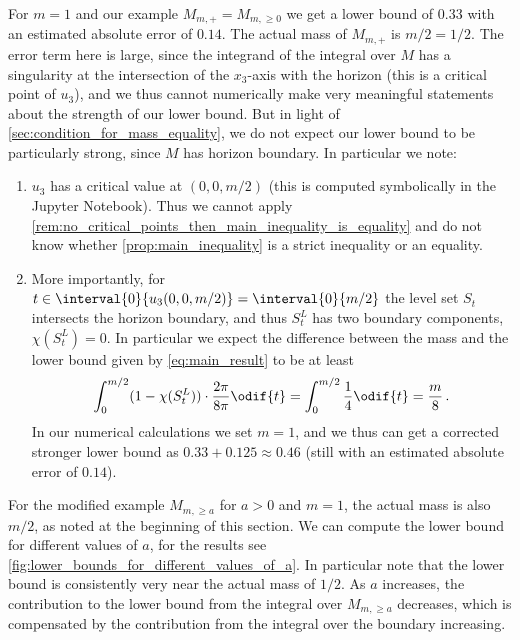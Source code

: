 \documentclass[titlepage,numbers=noenddot,oneside,%
cleardoublepage=empty,paper=a4,fontsize=11pt,%
english,%
]{scrartcl}
\newcommand*{\mathfullstop}{\,.}
\begin{document}
For \( m=1 \) and our example \( M_{m,+}=M_{m,\geq 0} \) we get a lower bound of \( 0.33 \) with an estimated absolute error of \( 0.14 \). The actual mass of \( M_{m,+} \) is \( m/2=1/2 \). The error term here is large, since the integrand of the integral over \( M \) has a singularity at the intersection of the \( x_3 \)-axis with the horizon (this is a critical point of \( u_3 \)), and we thus cannot numerically make very meaningful statements about the strength of our lower bound. But in light of \cref{sec:condition_for_mass_equality}, we do not expect our lower bound to be particularly strong, since \( M \) has horizon boundary. In particular we note:
\begin{enumerate}
    \item \( u_3 \) has a critical value at \( (0,0,m/2) \) (this is computed symbolically in the Jupyter Notebook). Thus we cannot apply \cref{rem:no_critical_points_then_main_inequality_is_equality} and do not know whether \cref{prop:main_inequality} is a strict inequality or an equality.
    \item More importantly, for \( t\in \interval{0}{u_3(0,0,m/2)}=\interval{0}{m/2} \) the level set \( S_t \) intersects the horizon boundary, and thus \( S_t^L \) has two boundary components, \ie \( \chi(S_t^L)=0 \). In particular we expect the difference between the mass and the lower bound given by \cref{eq:main_result} to be at least
    \begin{equation*}
        \int_{0}^{m/2}(1-\chi(S_t^L))\cdot \frac{2\pi}{8\pi} \odif{t}=\int_0^{m/2}\frac{1}{4}\odif{t}=\frac{m}{8}\mathfullstop
    \end{equation*}
    In our numerical calculations we set \( m=1 \), and we thus can get a corrected stronger lower bound as \( 0.33+0.125\approx 0.46 \) (still with an estimated absolute error of \( 0.14 \)).
\end{enumerate}

For the modified example \( M_{m,\geq a} \) for \( a>0 \) and \( m=1 \), the actual mass is also \( m/2 \), as noted at the beginning of this section. We can compute the lower bound for different values of \( a \), for the results see \cref{fig:lower_bounds_for_different_values_of_a}. In particular note that the lower bound is consistently very near the actual mass of \( 1/2 \). As \( a \) increases, the contribution to the lower bound from the integral over \( M_{m,\geq a} \) decreases, which is compensated by the contribution from the integral over the boundary increasing. 
\end{document}
